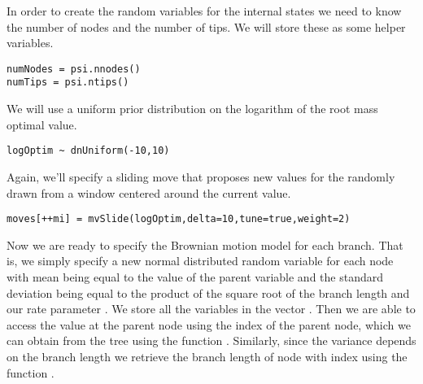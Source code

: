 In order to create the random variables for the internal states we need to know the number of nodes and the number of tips.
We will store these as some helper variables.
{\tt \small \begin{snugshade*}
\begin{lstlisting}
numNodes = psi.nnodes()
numTips = psi.ntips()
\end{lstlisting}
\end{snugshade*}}

We will use a uniform prior distribution on the logarithm of the root mass optimal value.
{\tt \small \begin{snugshade*}
\begin{lstlisting}
logOptim ~ dnUniform(-10,10)
\end{lstlisting}
\end{snugshade*}}
Again, we'll specify a sliding move that proposes new values for the  randomly drawn from a window centered around the current value.
{\tt \small \begin{snugshade*}
\begin{lstlisting}
moves[++mi] = mvSlide(logOptim,delta=10,tune=true,weight=2)
\end{lstlisting}
\end{snugshade*}}

Now we are ready to specify the Brownian motion model for each branch.
That is, we simply specify a new normal distributed random variable for each node with mean being equal to the value of the parent variable and the standard deviation being equal to the product of the square root of the branch length and our rate parameter . We store all the variables in the vector . Then we are able to access the value at the parent node using the index of the parent node, which we can obtain from the tree using the function . Similarly, since the variance depends on the branch length we retrieve the branch length of node with index  using the function .

